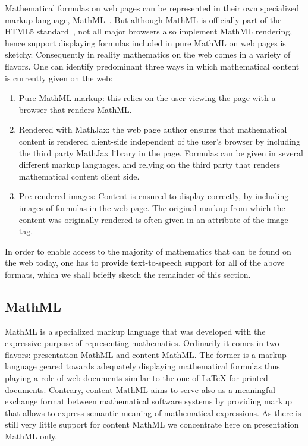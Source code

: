 \documentclass{acm_proc_article-sp}
\begin{document}
Mathematical formulas on web pages can be represented in their own specialized
markup language, MathML~\cite{MathML3}. But although MathML is officially part
of the HTML5 standard~\cite{HTML5}, not all major browsers also implement MathML
rendering, hence support displaying formulas included in pure MathML on web
pages is sketchy. Consequently in reality mathematics on the web comes in a
variety of flavors. One can identify predominant three ways in which
mathematical content is currently given on the web:
\begin{enumerate}
\item Pure MathML markup: this relies on the user viewing the
  page with a browser that renders MathML.
\item Rendered with MathJax: the web page author ensures that mathematical
  content is rendered client-side independent of the user's browser by including
  the third party MathJax library in the page. Formulas can be given in several
  different markup languages.  and relying on the third party that renders
  mathematical content client side.
\item Pre-rendered images: Content is ensured to display correctly, by including
  images of formulas in the web page. The original markup from which the content
  was originally rendered is often given in an attribute of the image tag.
\end{enumerate}

In order to enable access to the majority of mathematics that can be found on
the web today, one has to provide text-to-speech support for all of the above
formats, which we shall briefly sketch the remainder of this section.

\subsection{MathML}
\label{sec:mathml}

MathML is a specialized markup language that was developed with the expressive
purpose of representing mathematics. Ordinarily it comes in two flavors:
presentation MathML and content MathML. The former is a markup language geared
towards adequately displaying mathematical formulas thus playing a role of web
documents similar to the one of {\LaTeX} for printed documents.  Contrary,
content MathML aims to serve also as a meaningful exchange format between
mathematical software systems by providing markup that allows to express
semantic meaning of mathematical expressions. As there is still very little
support for content MathML we concentrate here on presentation MathML only.
  
\end{document}
